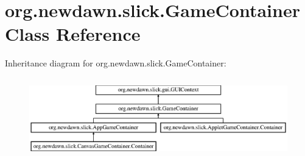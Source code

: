 \hypertarget{classorg_1_1newdawn_1_1slick_1_1_game_container}{}\section{org.\+newdawn.\+slick.\+Game\+Container Class Reference}
\label{classorg_1_1newdawn_1_1slick_1_1_game_container}
Inheritance diagram for org.\+newdawn.\+slick.\+Game\+Container\+:\begin{figure}[H]
\begin{center}
\leavevmode
\includegraphics[height=3.522013cm]{classorg_1_1newdawn_1_1slick_1_1_game_container}
\end{center}
\end{figure}
